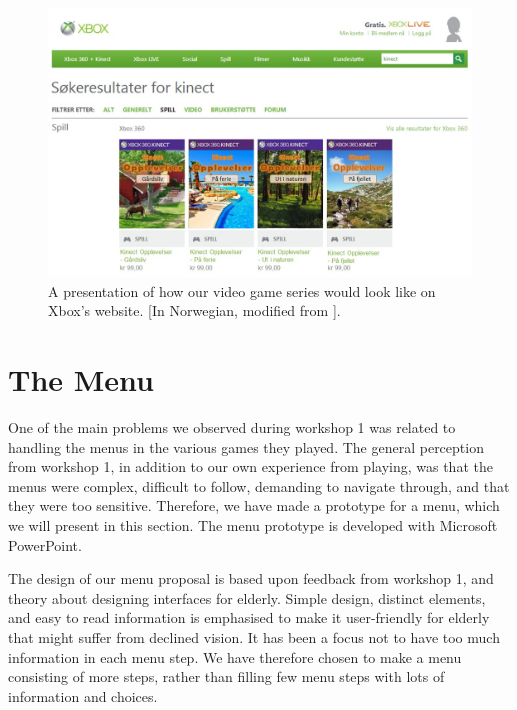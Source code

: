 \begin{figure} [ht!]
\centering
\includegraphics[scale=0.5, angle=90]{SpillXboxNYNY.jpg}
\caption[Presentation of our video game series]{A presentation of how our video game series would look like on Xbox's website. [In Norwegian, modified from \cite{XboxNettside}].}
\label{fig:videogameseriesHele}
\end{figure}

\section{The Menu}
\label{sec:menu}

One of the main problems we observed during workshop 1 was related to handling the menus in the various games they played. The general perception from workshop 1, in addition to our own experience from playing, was that the menus were complex, difficult to follow, demanding to navigate through, and that they were too sensitive. Therefore, we have made a prototype for a menu, which we will present in this section. The menu prototype is developed with Microsoft PowerPoint.

The design of our menu proposal is based upon feedback from workshop 1, and theory about designing interfaces for elderly. Simple design, distinct elements, and easy to read information is emphasised to make it user-friendly for elderly that might suffer from declined vision. It has been a focus not to have too much information in each menu step. We have therefore chosen to make a menu consisting of more steps, rather than filling few menu steps with lots of information and choices.   

